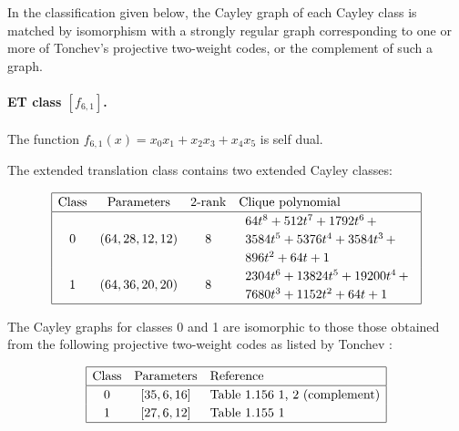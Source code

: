 \documentclass[12pt,a4paper]{article}
\begin{document}
In the classification given below, the Cayley graph of each Cayley class is matched by isomorphism
with a strongly regular graph corresponding to one
or more of Tonchev's projective two-weight codes, or the complement of such a graph.

\paragraph*{ET class $[f_{6,1}]$.}

The function
$f_{6,1}(x) = x_0 x_1 + x_2 x_3 + x_4 x_5$ is self dual.

The extended translation class contains
two extended Cayley classes:

\small{}
\begin{align*}
\def\arraystretch{1.2}
\begin{array}{|cccl|}
\hline
\text{Class} &
\text{Parameters} &
\text{2-rank} &
\text{Clique polynomial}
\\
\hline
0 &
(64, 28, 12, 12) &
8 &
\begin{array}{l}
64t^{8} + 512t^{7} + 1792t^{6}
\,+
\\
 3584t^{5} + 5376t^{4} + 3584t^{3}
\,+
\\
 896t^{2} + 64t + 1
\end{array}
\\
1 &
(64, 36, 20, 20) &
8 &
\begin{array}{l}
2304t^{6} + 13824t^{5} + 19200t^{4}
\,+
\\
 7680t^{3} + 1152t^{2} + 64t + 1
\end{array}
\\
\hline
\end{array}
\end{align*}

The Cayley graphs for classes 0 and 1 are isomorphic to those those obtained from the following
projective two-weight
codes as listed by Tonchev \cite{Ton07codes}:

\begin{align*}
\def\arraystretch{1.2}
\begin{array}{|ccl|}
\hline
\text{Class} &
\text{Parameters} & \text{Reference}
\\
\hline
0 & [35,6,16] & \text{Table 1.156 1, 2 (complement)}
\\
1 & [27,6,12] & \text{Table 1.155 1 }
\\
\hline
\end{array}
\end{align*}
\end{document}
